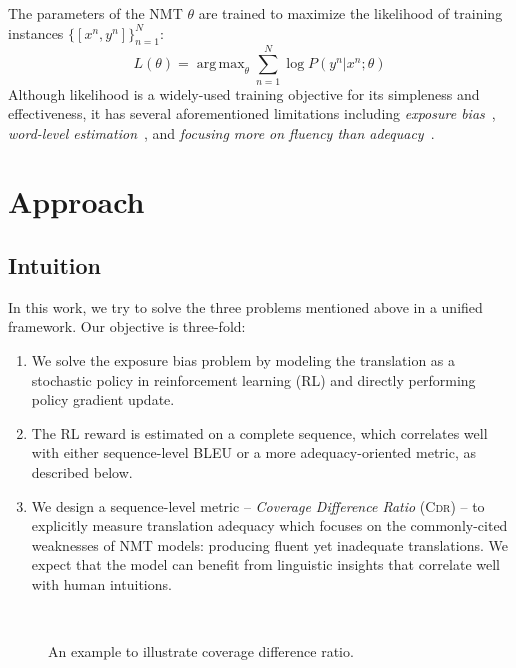 \documentclass[letterpaper]{article} \usepackage{aaai19}  \usepackage{times}  \usepackage{helvet}  \usepackage{courier}  \usepackage{url}  \usepackage{graphicx}  \frenchspacing  \setlength{\pdfpagewidth}{8.5in}  \setlength{\pdfpageheight}{11in}  \usepackage{amsmath}
\DeclareMathOperator*{\argmax}{arg\,max}
\begin{document}
The parameters of the NMT $\theta$ are trained to maximize the likelihood of training instances $\{[x^{n},y^{n}]\}_{n=1}^{N}$:
\begin{equation}\label{eqn:mle}
    L(\theta) = \argmax_{\theta}\sum_{n=1}^{N}\log P(y^{n}|x^{n};\theta)
\end{equation}
Although likelihood is a widely-used training objective for its simpleness and effectiveness, it has several aforementioned limitations including {\em exposure bias}~\cite{Ranzato:2016:ICLR,Wiseman:2016:EMNLP}, {\em word-level estimation}~\cite{Shen:2016:ACL}, and {\em focusing more on fluency than adequacy}~\cite{Tu:2017:AAAI}.

\section{Approach}



\subsection{Intuition}




\noindent In this work, we try to solve the three problems mentioned above in a unified framework.
Our objective is three-fold:
\begin{enumerate}
    \item We solve the exposure bias problem by modeling the translation as a stochastic policy in reinforcement learning (RL) and directly performing policy gradient update.
    \item The RL reward is estimated on a complete sequence, which correlates well with either sequence-level BLEU or a more adequacy-oriented metric, as described below.
    \item We design a sequence-level metric -- {\em Coverage Difference Ratio} (\textsc{Cdr}) -- to explicitly measure translation adequacy which focuses on the commonly-cited  weaknesses of NMT models: producing fluent yet inadequate translations. We expect that the model can benefit from linguistic insights that correlate well with human intuitions.
\end{enumerate}



\begin{figure}[t]
\centering
{}
\\
\caption{An example to illustrate coverage difference ratio.}
\label{fig-example}

\end{figure}
\end{document}
